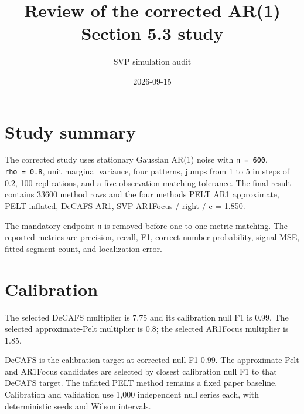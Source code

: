 \documentclass[
  10pt,
]{article}
\title{Review of the corrected AR(1) Section 5.3 study}
\author{SVP simulation audit}
\date{2026-09-15}
\begin{document}
\maketitle

\section{Study summary}\label{study-summary}

The corrected study uses stationary Gaussian AR(1) noise with
\texttt{n\ =\ 600}, \texttt{rho\ =\ 0.8}, unit marginal variance, four
patterns, jumps from 1 to 5 in steps of 0.2, 100 replications, and a
five-observation matching tolerance. The final result contains 33600
method rows and the four methods PELT AR1 approximate, PELT inflated,
DeCAFS AR1, SVP AR1Focus / right / c = 1.850.

The mandatory endpoint \texttt{n} is removed before one-to-one metric
matching. The reported metrics are precision, recall, F1, correct-number
probability, signal MSE, fitted segment count, and localization error.

\section{Calibration}\label{calibration}

The selected DeCAFS multiplier is 7.75 and its calibration null F1 is
0.99. The selected approximate-Pelt multiplier is 0.8; the selected
AR1Focus multiplier is 1.85.

DeCAFS is the calibration target at corrected null F1 0.99. The
approximate Pelt and AR1Focus candidates are selected by closest
calibration null F1 to that DeCAFS target. The inflated PELT method
remains a fixed paper baseline. Calibration and validation use 1,000
independent null series each, with deterministic seeds and Wilson
intervals.
\end{document}
